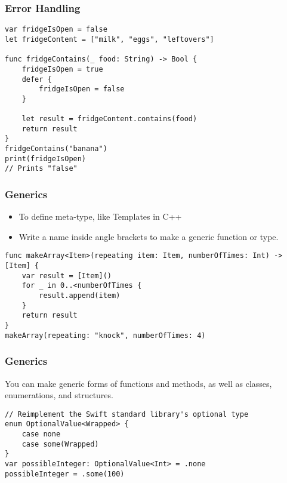 \begin{frame}[fragile] \frametitle{Error Handling}

\begin{lstlisting}
var fridgeIsOpen = false
let fridgeContent = ["milk", "eggs", "leftovers"]

func fridgeContains(_ food: String) -> Bool {
    fridgeIsOpen = true
    defer {
        fridgeIsOpen = false
    }

    let result = fridgeContent.contains(food)
    return result
}
fridgeContains("banana")
print(fridgeIsOpen)
// Prints "false"
\end{lstlisting}
\end{frame}

\begin{frame}[fragile] \frametitle{Generics}

\begin{itemize}
\item To define meta-type, like Templates in C++
\item Write a name inside angle brackets to make a generic function or type.
\end{itemize}

\begin{lstlisting}
func makeArray<Item>(repeating item: Item, numberOfTimes: Int) -> [Item] {
    var result = [Item]()
    for _ in 0..<numberOfTimes {
        result.append(item)
    }
    return result
}
makeArray(repeating: "knock", numberOfTimes: 4)
\end{lstlisting}
\end{frame}

\begin{frame}[fragile] \frametitle{Generics}

You can make generic forms of functions and methods, as well as classes, enumerations, and structures.

\begin{lstlisting}
// Reimplement the Swift standard library's optional type
enum OptionalValue<Wrapped> {
    case none
    case some(Wrapped)
}
var possibleInteger: OptionalValue<Int> = .none
possibleInteger = .some(100)
\end{lstlisting}
\end{frame}


